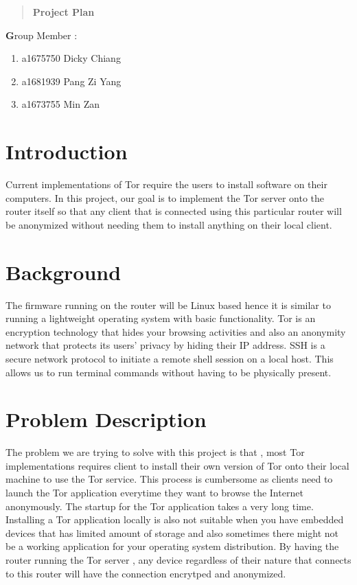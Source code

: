 \documentclass[12pt]{article}
\begin{document}
	\begin{quote}
		\centering
		\textbf {Project Plan}
	\end{quote}
	
	\textbf Group Member :
	\begin{enumerate}
		\item a1675750 Dicky Chiang 
		\item a1681939 Pang Zi Yang
		\item a1673755 Min Zan 
	\end{enumerate}
	
	\section{Introduction}
	
	 Current implementations of Tor require the users to install software on their computers. In this project, our goal is to implement the Tor server onto the router itself so that any client that is connected using this particular router will be anonymized without needing them to install anything on their local client.
	
	\section{Background}
	
	The firmware running on the router will be Linux based hence it is similar to running a lightweight operating system with basic functionality. Tor is an encryption technology that hides your browsing activities and also an anonymity network that protects its users' privacy by hiding their IP address. SSH is a secure network protocol to initiate a remote shell session on a local host. This allows us to run terminal commands without having to be physically present.
	
	\section{Problem Description}
	
	The problem we are trying to solve with this project is that , most Tor implementations requires client to install their own version of Tor onto their local machine to use the Tor service. This  process is cumbersome as clients need to launch the Tor application everytime they want to browse the Internet anonymously. The startup for the Tor application takes a very long time. Installing a Tor application locally is also not suitable when you have embedded devices that has limited amount of storage and also sometimes there might not be a working application for your operating system distribution. By having the router running the Tor server , any device regardless of their nature that connects to this router will have the connection encrytped and anonymized. 
	
\end{document}
